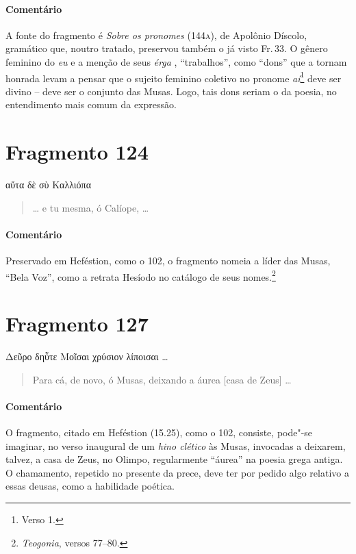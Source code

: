 \medskip

{\paragraph{Comentário} A fonte do fragmento é \textit{Sobre os pronomes} (144\textsc{a}), de Apolônio
Díscolo, gramático que, noutro tratado, preservou também o já visto Fr.\,33. O
gênero feminino do \textit{eu} e a menção de seus \textit{érga }, ``trabalhos'', como
``dons'' que a tornam honrada levam a pensar que o sujeito feminino
coletivo no pronome \textit{aí}\footnote{Verso 1.} deve ser divino -- deve ser o conjunto das Musas. Logo, tais dons
seriam o da poesia, no entendimento mais comum da expressão.}


\section{Fragmento 124}

\begin{gkverse}
αὔτα δὲ σὺ Καλλιόπα
\end{gkverse}

\begin{verse}
\ldots{} e tu mesma, ó Calíope, \ldots{}
\end{verse}

\medskip

{\paragraph{Comentário} Preservado em Heféstion, como o 102, o fragmento nomeia a líder das Musas, ``Bela Voz'', como a retrata Hesíodo no catálogo de seus nomes.\footnote{\textit{Teogonia}, versos 77--80.}}



\pagebreak
\section{Fragmento 127}

\begin{gkverse}
Δεῦρο δηὖτε Μοῖσαι χρύσιον λίποισαι \ldots{}
\end{gkverse}

\begin{verse}
Para cá, de novo, ó Musas, deixando a áurea [casa de Zeus] \ldots{}
\end{verse}

\medskip

{\paragraph{Comentário} O fragmento, citado em Heféstion (15.25), como o 102, consiste, pode"-se imaginar, no
verso inaugural de um \textit{hino clético }às Musas, invocadas a deixarem,
talvez, a casa de Zeus, no Olimpo, regularmente ``áurea''
na poesia grega antiga. O chamamento, repetido no presente da prece, deve ter
por pedido algo relativo a essas deusas, como a habilidade poética.}

